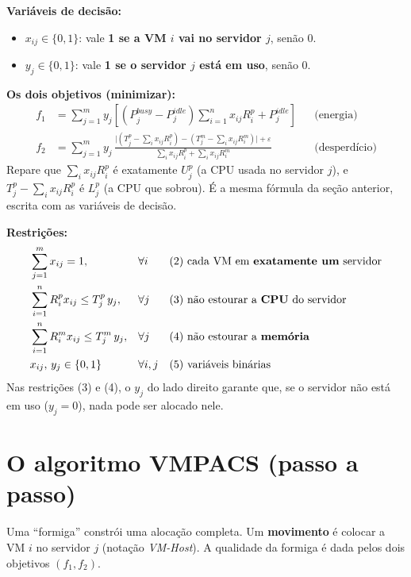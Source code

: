\documentclass[11pt]{article}
\newcommand{\var}[1]{\textcolor{azul}{$#1$}}
\begin{document}
\textbf{Variáveis de decisão:}
\begin{itemize}[leftmargin=1.4em,itemsep=1pt]
  \item \var{x_{ij}\in\{0,1\}}: vale \textbf{1 se a VM $i$ vai no servidor $j$},
  senão 0.
  \item \var{y_j\in\{0,1\}}: vale \textbf{1 se o servidor $j$ está em uso},
  senão 0.
\end{itemize}
\textbf{Os dois objetivos (minimizar):}
\begin{align*}
f_1 &= \sum_{j=1}^{m} y_j\!\left[(P^{busy}_j-P^{idle}_j)\sum_{i=1}^{n} x_{ij}R^p_i + P^{idle}_j\right] && \text{(energia)}\\
f_2 &= \sum_{j=1}^{m} y_j\,\frac{\big|(T^p_j-\sum_i x_{ij}R^p_i)-(T^m_j-\sum_i x_{ij}R^m_i)\big|+\varepsilon}{\sum_i x_{ij}R^p_i+\sum_i x_{ij}R^m_i} && \text{(desperdício)}
\end{align*}
Repare que $\sum_i x_{ij}R^p_i$ é exatamente \var{U^p_j} (a CPU usada no servidor
$j$), e $T^p_j-\sum_i x_{ij}R^p_i$ é \var{L^p_j} (a CPU que sobrou). É a mesma
fórmula da seção anterior, escrita com as variáveis de decisão.

\textbf{Restrições:}
\begin{align*}
&\sum_{j=1}^{m} x_{ij}=1, &&\forall i && \text{(2) cada VM em \textbf{exatamente um} servidor}\\
&\sum_{i=1}^{n} R^p_i x_{ij}\le T^p_j\,y_j, &&\forall j && \text{(3) não estourar a \textbf{CPU} do servidor}\\
&\sum_{i=1}^{n} R^m_i x_{ij}\le T^m_j\,y_j, &&\forall j && \text{(4) não estourar a \textbf{memória}}\\
&x_{ij},\,y_j\in\{0,1\} &&\forall i,j && \text{(5) variáveis binárias}
\end{align*}
Nas restrições (3) e (4), o $y_j$ do lado direito garante que, se o servidor não
está em uso ($y_j=0$), nada pode ser alocado nele.

\section{O algoritmo VMPACS (passo a passo)}
Uma ``formiga'' constrói uma alocação completa. Um \textbf{movimento} é colocar
a VM $i$ no servidor $j$ (notação \emph{VM-Host}). A qualidade da formiga é dada
pelos dois objetivos $(f_1,f_2)$.
\end{document}
